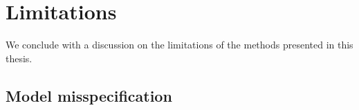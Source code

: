 \documentclass[a4paper, 10pt]{report}
\theoremstyle{plain}
\begin{document}
	
	\clearpage
	\section{Limitations}
	\label{sec:limitations}
	
	We conclude with a discussion on the limitations of the methods presented in this thesis.
	
	\subsection{Model misspecification}
	
\end{document}
